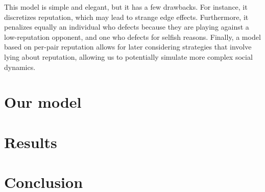 \documentclass{amsart}
\begin{document}
This model is simple and elegant, but it has a few drawbacks. For instance, it discretizes reputation, which may lead to strange edge effects. Furthermore, it penalizes equally an individual who defects because they are playing against a low-reputation opponent, and one who defects for selfish reasons. Finally, a model based on per-pair reputation allows for later considering strategies that involve lying about reputation, allowing us to potentially simulate more complex social dynamics.

\section{Our model}

\section{Results}

\section{Conclusion}



\end{document}
